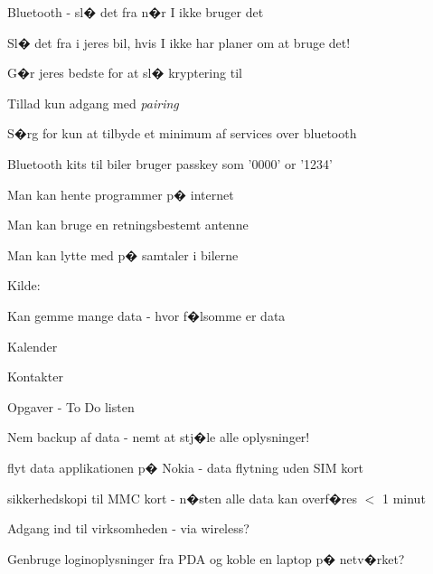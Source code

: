 \documentclass[20pt,landscape,a4paper,footrule]{foils}
\begin{document}

\begin{list2}
\item Bluetooth - sl� det fra n�r I ikke bruger det
\item Sl� det fra i jeres bil, hvis I ikke har planer om at bruge det!
\item G�r jeres bedste for at sl� kryptering til
\item Tillad kun adgang med \emph{pairing}
\item S�rg for kun at tilbyde et minimum af services over bluetooth
\end{list2}




\begin{list1}
\item Bluetooth kits til biler bruger passkey som '0000' or '1234'
\begin{list2}
\item Man kan hente programmer p� internet
\item Man kan bruge en retningsbestemt antenne
\item Man kan lytte med p� samtaler i bilerne
\end{list2}
\end{list1}

Kilde:\\



\begin{list1}
\item Kan gemme mange data - hvor f�lsomme er data
\begin{list2}
\item Kalender
\item Kontakter
\item Opgaver - To Do listen
\end{list2}
\item Nem backup af data - nemt at stj�le alle oplysninger!
\begin{list2}
\item flyt data applikationen p� Nokia - data flytning {\color{red}
    uden SIM kort}
\item sikkerhedskopi til MMC kort - n�sten alle data kan overf�res $<$
  1 minut
\end{list2}
\item Adgang ind til virksomheden - via wireless?
\begin{list2}
\item Genbruge loginoplysninger fra PDA og koble en laptop p� netv�rket?
\end{list2}
\end{list1}
\end{document}
